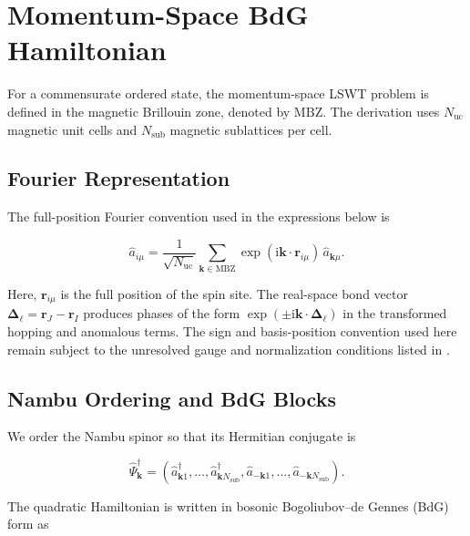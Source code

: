 
\hypertarget{sec-lswt-momentum-space-bdg-hamiltonian}{%
\section{Momentum-Space BdG Hamiltonian}\label{sec-lswt-momentum-space-bdg-hamiltonian}}

For a commensurate ordered state, the momentum-space LSWT problem is defined in the magnetic Brillouin zone, denoted by \(\mathrm{MBZ}\). The derivation uses \(N_{\mathrm{uc}}\) magnetic unit cells and \(N_{\mathrm{sub}}\) magnetic sublattices per cell.

\subsection{Fourier Representation}

The full-position Fourier convention used in the expressions below is

\[
\hat a_{i\mu}
=\frac{1}{\sqrt{N_{\mathrm{uc}}}}
\sum_{\mathbf k\in\mathrm{MBZ}}
\exp(\mathrm i\mathbf k\cdot\mathbf r_{i\mu})\,
\hat a_{\mathbf k\mu}.
\]

Here, \(\mathbf r_{i\mu}\) is the full position of the spin site. The real-space bond vector \(\boldsymbol\Delta_\ell=\mathbf r_J-\mathbf r_I\) produces phases of the form \(\exp(\pm\mathrm i\mathbf k\cdot\boldsymbol\Delta_\ell)\) in the transformed hopping and anomalous terms. The sign and basis-position convention used here remain subject to the unresolved gauge and normalization conditions listed in .

\subsection{Nambu Ordering and BdG Blocks}

We order the Nambu spinor so that its Hermitian conjugate is

\[
\hat\Psi_{\mathbf k}^\dagger
=\left(
\hat a_{\mathbf k1}^\dagger,\ldots,
\hat a_{\mathbf k N_{\mathrm{sub}}}^\dagger,
\hat a_{-\mathbf k1},\ldots,
\hat a_{-\mathbf k N_{\mathrm{sub}}}
\right).
\]

The quadratic Hamiltonian is written in bosonic Bogoliubov--de Gennes (BdG) form as

